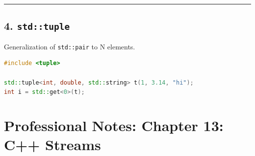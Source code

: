 \begin{center}\rule{0.5\linewidth}{0.5pt}\end{center}

\hypertarget{stdtuple}{%
\section{\texorpdfstring{4.
\texttt{std::tuple}}{4. std::tuple}}\label{stdtuple}}

Generalization of \passthrough{\lstinline!std::pair!} to N elements.

\begin{lstlisting}[language={C++}]
#include <tuple>

std::tuple<int, double, std::string> t(1, 3.14, "hi");
int i = std::get<0>(t);
\end{lstlisting}

\hypertarget{professional-notes-chapter-13-c-streams}{%
\chapter{Professional Notes: Chapter 13: C++
Streams}\label{professional-notes-chapter-13-c-streams}}

